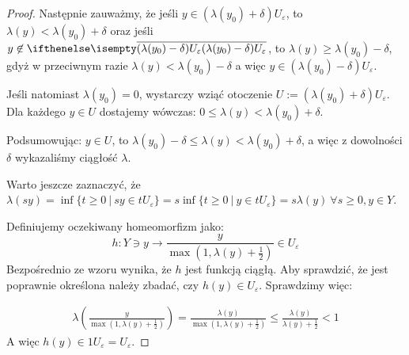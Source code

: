 \begin{lem}
\begin{proof}
    Następnie zauważmy, że jeśli $y \in (\lambda(y_0) + \delta) U_\varepsilon$, to $\lambda(y) < \lambda(y_0) + \delta$ oraz jeśli $y \not\in \cl{(\lambda(y_0) - \delta) U_\varepsilon}$, to $\lambda(y) \geq \lambda(y_0) - \delta$, gdyż w przeciwnym razie $\lambda(y) < \lambda(y_0) - \delta$ a więc $y \in (\lambda(y_0) - \delta) U_\varepsilon$.
    
    Jeśli natomiast $\lambda(y_0) = 0$, wystarczy wziąć otoczenie $U := (\lambda(y_0) + \delta)U_\varepsilon$. Dla każdego $y \in U$ dostajemy wówczas: $0 \leq \lambda(y) < \lambda(y_0) + \delta$.
    
    Podsumowując: $y \in U$, to $\lambda(y_0) - \delta \leq \lambda(y) < \lambda(y_0) + \delta$, a więc z dowolności $\delta$ wykazaliśmy ciągłość $\lambda$.
    
    Warto jeszcze zaznaczyć, że $\lambda(sy) = \inf \{t \geq 0\ |\ sy \in t U_\varepsilon\} = s\inf \{t \geq 0\ |\ y \in t U_\varepsilon\} = s \lambda(y)\ \forall s \geq 0, y \in Y$.
    
    Definiujemy oczekiwany homeomorfizm jako:
    \[
      h: Y \ni y \to \frac{y}{\max\left(1, \lambda(y) + \frac{1}{2}\right)} \in U_\varepsilon
    \]
    Bezpośrednio ze wzoru wynika, że $h$ jest funkcją ciągłą. Aby sprawdzić, że jest poprawnie określona należy zbadać, czy $h(y) \in U_\varepsilon$. Sprawdzimy więc:
    
    \begin{align*}
      \lambda\left(\frac{y}{\max\left(1, \lambda(y) + \frac{1}{2}\right)}\right) =
      \frac{\lambda(y)}{\max\left(1, \lambda(y) + \frac{1}{2}\right)} \leq
      \frac{\lambda(y)}{\lambda(y) + \frac{1}{2}} < 1
    \end{align*}
    A więc $h(y) \in 1 U_\varepsilon = U_\varepsilon$.
    

\end{proof}
\end{lem}
